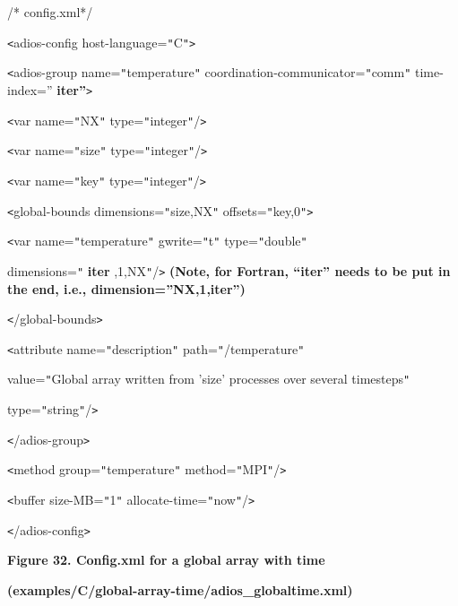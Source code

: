 /* config.xml*/

\texttt{<}adios-config host-language=\texttt{"}C\texttt{"}\texttt{>}

\parindent=14pt
\texttt{<}adios-group name=\texttt{"}temperature\texttt{"} coordination-communicator=\texttt{"}comm\texttt{"} 
time-index=''{\color{color02} \textbf{iter''}}\texttt{>}

\parindent=28pt
\texttt{<}var name=\texttt{"}NX\texttt{"} type=\texttt{"}integer\texttt{"}/\texttt{>}

\texttt{<}var name=\texttt{"}size\texttt{"} type=\texttt{"}integer\texttt{"}/\texttt{>}

\parindent=57pt
\texttt{<}var name=\texttt{"}key\texttt{"} type=\texttt{"}integer\texttt{"}/\texttt{>}

\parindent=0pt
{\color{color02} \texttt{<}global-bounds dimensions=\texttt{"}size,NX\texttt{"} 
offsets=\texttt{"}key,0\texttt{"}\texttt{>}}

{\color{color02} \texttt{<}var name=\texttt{"}temperature\texttt{"} gwrite=\texttt{"}t\texttt{"} 
type=\texttt{"}double\texttt{"} }

{\color{color02} dimensions=\texttt{"}}{\color{color02} \textbf{iter}}{\color{color02} ,1,NX\texttt{"}/\texttt{>} 
   }{\color{color02} \textbf{(Note, for Fortran, ``iter'' needs to be put in the 
end, i.e., dimension=''NX,1,iter'')}}

\parindent=14pt
{\color{color02} \texttt{<}/global-bounds\texttt{>}}

\parindent=28pt
\texttt{<}attribute name=\texttt{"}description\texttt{"} path=\texttt{"}/temperature\texttt{"} 

\parindent=43pt
value=\texttt{"}Global array written from 'size' processes over several timesteps\texttt{"} 

type=\texttt{"}string\texttt{"}/\texttt{>}

\parindent=57pt
\texttt{<}/adios-group\texttt{>}

\parindent=0pt
\texttt{<}method group=\texttt{"}temperature\texttt{"} method=\texttt{"}MPI\texttt{"}/\texttt{>}

\texttt{<}buffer size-MB=\texttt{"}1\texttt{"} allocate-time=\texttt{"}now\texttt{"}/\texttt{>}

\texttt{<}/adios-config\texttt{>}

\label{HToc144350191}

\begin{center}
{\color{color20} \textbf{Figure 32. Config.xml for a global array with time}}

{\color{color20} \textbf{(examples/C/global-array-time/adios\_globaltime.xml)}}
\end{center}

